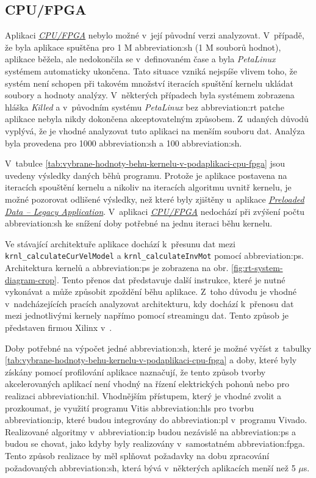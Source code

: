 \documentclass[a4paper, twoside, 11pt]{article}
\begin{document}
	\subsection{CPU/FPGA}\label{subsec:poznatky-ziskane-profilovanim-aplikaci-cpu-fpga}
		Aplikaci \hyperref[subsec:cpu-fpga]{\textit{CPU/FPGA}} nebylo možné v~její původní verzi analyzovat. V~případě, že byla aplikace spuštěna pro 1 M \gls{abbreviation:sh} (1 M souborů hodnot), aplikace běžela, ale nedokončila se v~definovaném čase a byla \textit{PetaLinux} systémem automaticky ukončena. Tato situace vzniká nejspíše vlivem toho, že systém není schopen při takovém množství iteracích spuštění kernelu ukládat soubory a hodnoty analýzy. V~některých případech byla systémem zobrazena hláška \textit{Killed} a v~původním systému \textit{PetaLinux} bez \gls{abbreviation:rt} patche aplikace nebyla nikdy dokončena akceptovatelným způsobem. Z~udaných důvodů vyplývá, že je vhodné analyzovat tuto aplikaci na menším souboru dat. Analýza byla provedena pro 1000 \gls{abbreviation:sh} a 100 \gls{abbreviation:sh}.\par
		V~tabulce \ref{tab:vybrane-hodnoty-behu-kernelu-v-podaplikaci-cpu-fpga} jsou uvedeny výsledky daných běhů programu. Protože je aplikace postavena na iteracích spouštění kernelu a nikoliv na iteracích algoritmu uvnitř kernelu, je možné pozorovat odlišené výsledky, než které byly zjištěny u~aplikace \hyperref[subsec:poznatky-ziskane-profilovanim-aplikaci-preloaded-data-legacy-application]{\textit{Preloaded Data – Legacy Application}}. V~aplikaci \hyperref[subsec:cpu-fpga]{\textit{CPU/FPGA}} nedochází při zvýšení počtu \gls{abbreviation:sh} ke snížení doby potřebné na jednu iteraci běhu kernelu.\par
		Ve stávající architektuře aplikace dochází k~přesunu dat mezi \texttt{ krnl\_calculateCurVelModel} a \texttt{krnl\_calculateInvMot} pomocí \gls{abbreviation:ps}. Architektura kernelů a \gls{abbreviation:ps} je zobrazena na obr. \ref{fig:rt-system-diagram-crop}. Tento přenos dat představuje další instrukce, které je nutné vykonávat a může způsobit zpoždění běhu aplikace. Z~toho důvodu je vhodné v~nadcházejících pracích analyzovat architekturu, kdy dochází k~přenosu dat mezi jednotlivými kernely napřímo pomocí streamingu dat. Tento způsob je představen firmou Xilinx v~\cite{xilinx-github-vitis-accel-examples-stream-free-running-kernel}.\par
		Doby potřebné na výpočet jedné \gls{abbreviation:sh}, které je možné vyčíst z~tabulky \ref{tab:vybrane-hodnoty-behu-kernelu-v-podaplikaci-cpu-fpga} a doby, které byly získány pomocí profilování aplikace naznačují, že tento způsob tvorby akcelerovaných aplikací není vhodný na řízení elektrických pohonů nebo pro realizaci \gls{abbreviation:hil}. Vhodnějším přístupem, který je vhodné zvolit a prozkoumat, je využití programu Vitis \gls{abbreviation:hls} pro tvorbu \gls{abbreviation:ip}, které budou integrovány do \gls{abbreviation:pl} v~programu Vivado. Realizované algoritmy v~\gls{abbreviation:ip} budou nezávislé na \gls{abbreviation:ps} a budou se chovat, jako kdyby byly realizovány v~samostatném \gls{abbreviation:fpga}. Tento způsob realizace by měl splňovat požadavky na dobu zpracování požadovaných \gls{abbreviation:sh}, která bývá v~některých aplikacích menší než 5 $\mu$s.
\end{document}
